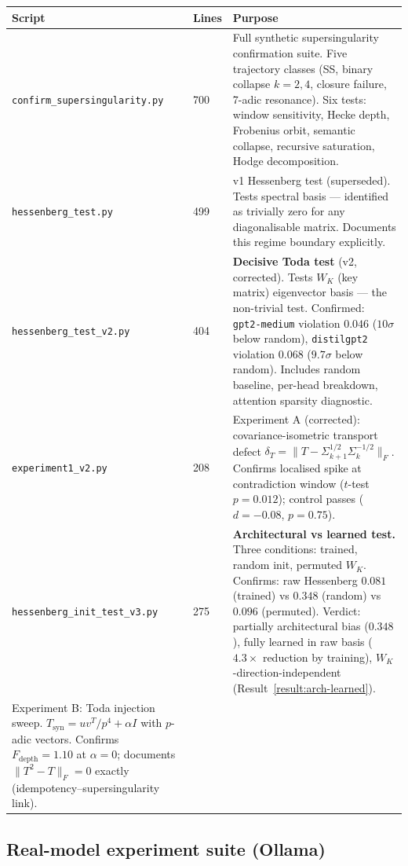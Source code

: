 \documentclass[11pt]{amsart}
\theoremstyle{definition}
\begin{document}
\begin{center}
\renewcommand{\arraystretch}{1.2}
\small
\begin{tabular}{@{}p{4.2cm}p{1.0cm}p{8.2cm}@{}}
\toprule
Script & Lines & Purpose \\
\midrule
\texttt{confirm\_supersingularity.py} & 700 &
  Full synthetic supersingularity confirmation suite.
  Five trajectory classes (SS, binary collapse $k=2,4$,
  closure failure, 7-adic resonance).
  Six tests: window sensitivity, Hecke depth, Frobenius orbit,
  semantic collapse, recursive saturation, Hodge decomposition. \\
\texttt{hessenberg\_test.py} & 499 &
  v1 Hessenberg test (superseded).
  Tests spectral basis — identified as trivially zero for any
  diagonalisable matrix. Documents this regime boundary explicitly. \\
\texttt{hessenberg\_test\_v2.py} & 404 &
  \textbf{Decisive Toda test} (v2, corrected).
  Tests $W_K$ (key matrix) eigenvector basis — the non-trivial test.
  Confirmed: \texttt{gpt2-medium} violation $0.046$ ($10\sigma$ below random),
  \texttt{distilgpt2} violation $0.068$ ($9.7\sigma$ below random).
  Includes random baseline, per-head breakdown, attention sparsity diagnostic. \\
\texttt{experiment1\_v2.py} & 208 &
  Experiment A (corrected): covariance-isometric transport defect
  $\delta_T = \|T - \Sigma_{k+1}^{1/2}\Sigma_k^{-1/2}\|_F$.
  Confirms localised spike at contradiction window ($t$-test $p=0.012$);
  control passes ($d=-0.08$, $p=0.75$). \\
\texttt{hessenberg\_init\_test\_v3.py} & 275 &
  \textbf{Architectural vs learned test.}
  Three conditions: trained, random init, permuted $W_K$.
  Confirms: raw Hessenberg $0.081$ (trained) vs $0.348$ (random) vs $0.096$ (permuted).
  Verdict: partially architectural bias ($0.348$), fully learned in raw basis
  ($4.3\times$ reduction by training), $W_K$-direction-independent
  (Result~\ref{result:arch-learned}). \\
  Experiment B: Toda injection sweep.
  $T_{\mathrm{syn}} = uv^T/p^4 + \alpha I$ with $p$-adic vectors.
  Confirms $F_\mathrm{depth} = 1.10$ at $\alpha=0$;
  documents $\|T^2-T\|_F = 0$ exactly (idempotency--supersingularity link). \\
\bottomrule
\end{tabular}
\end{center}

\subsection{Real-model experiment suite (Ollama)}
\end{document}

